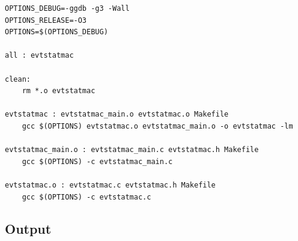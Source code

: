 \documentclass[12pt, a4paper]{article}
\begin{document}
\begin{scriptsize}
\begin{ttfamily}
\begin{lstlisting}
OPTIONS_DEBUG=-ggdb -g3 -Wall
OPTIONS_RELEASE=-O3 
OPTIONS=$(OPTIONS_DEBUG)

all : evtstatmac

clean:
	rm *.o evtstatmac
	
evtstatmac : evtstatmac_main.o evtstatmac.o Makefile
	gcc $(OPTIONS) evtstatmac.o evtstatmac_main.o -o evtstatmac -lm

evtstatmac_main.o : evtstatmac_main.c evtstatmac.h Makefile
	gcc $(OPTIONS) -c evtstatmac_main.c

evtstatmac.o : evtstatmac.c evtstatmac.h Makefile
	gcc $(OPTIONS) -c evtstatmac.c
\end{lstlisting}
\end{ttfamily}
\end{scriptsize}

\subsection{Output}
\end{document}
